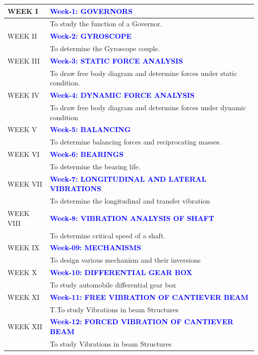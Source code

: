 \documentclass[11pt]{exam}
\begin{document}
	\centering
	\renewcommand{\arraystretch}{1.2}
\begin{longtable}{|>{\centering\arraybackslash}p{2.2cm}  | >{\raggedright\arraybackslash}p{13.8cm}  | }
		\hline 
		WEEK I & \textcolor{blue}{\textbf{Week-1: GOVERNORS}}\\
		\hline
		& To study the function of a Governor.\\
		\hline
		WEEK II & \textcolor{blue}{\textbf{ Week-2: GYROSCOPE}}\\
		\hline
		& To determine the Gyroscope couple.\\
		\hline
		WEEK III & \textcolor{blue}{\textbf{Week-3: STATIC FORCE ANALYSIS}}\\
		\hline
		&To draw free body diagram and determine forces under static condition.\\
		\hline
		WEEK IV & \textcolor{blue}{\textbf{Week-4: DYNAMIC FORCE ANALYSIS}}\\
		\hline
		&To draw free body diagram and determine forces under dynamic condition\\
		\hline
		WEEK V & \textcolor{blue}{\textbf{ Week-5: BALANCING}}\\
		\hline
		& To determine balancing forces and reciprocating masses.\\
		\hline
		WEEK VI & \textcolor{blue}{\textbf{Week-6: BEARINGS}}\\
		\hline
		&To determine the bearing life.\\
		\hline
		WEEK VII & \textcolor{blue}{\textbf{Week-7: LONGITUDINAL AND LATERAL VIBRATIONS}}\\
		\hline
		&To determine the longitudinal and transfer vibration\\
		\hline
		WEEK VIII & \textcolor{blue}{\textbf{Week-8: VIBRATION ANALYSIS OF SHAFT}}\\
		\hline
		&To determine critical speed of a shaft.\\
		\hline
		WEEK IX & \textcolor{blue}{\textbf{Week-09: MECHANISMS}}\\
		\hline
		&To design various mechanism and their inversions
		\\
		\hline
		WEEK X & \textcolor{blue}{\textbf{ Week-10: DIFFERENTIAL GEAR BOX}}\\
		\hline
		&To study automobile differential gear box\\
		\hline
		WEEK XI & \textcolor{blue}{\textbf{Week-11: FREE VIBRATION OF CANTIEVER BEAM}}\\
		\hline
		&T.To study Vibrations in beam Structures\\
		\hline
		WEEK XII & \textcolor{blue}{\textbf{Week-12: FORCED VIBRATION OF CANTIEVER BEAM}}\\
		\hline
		&To study Vibrations in beam Structures\\
		\hline
		
	\end{longtable}
\end{document}
